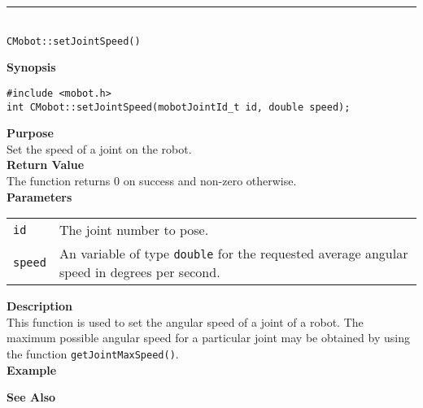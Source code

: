 \noindent
\vspace{5pt}
\rule{4.5in}{0.015in}\\
\noindent
{\LARGE \texttt{CMobot::setJointSpeed()}}\\
{}

\noindent
{\bf Synopsis}
\vspace{-8pt}
\begin{verbatim}
#include <mobot.h>
int CMobot::setJointSpeed(mobotJointId_t id, double speed);
\end{verbatim}

\noindent
{\bf Purpose}\\
Set the speed of a joint on the robot.\\

\noindent
{\bf Return Value}\\
The function returns 0 on success and non-zero otherwise.\\

\noindent
{\bf Parameters}
\vspace{-0.1in}
\begin{description}
\item               
\begin{tabular}{p{10 mm}p{145 mm}}
\texttt{id} & The joint number to pose. \\
\texttt{speed} & An variable of type \texttt{double} for the requested average
angular speed in degrees per second.
\end{tabular}
\end{description}

\noindent
{\bf Description}\\
This function is used to set the angular speed of a joint of a robot. The
maximum possible angular speed for a particular joint may be obtained
by using the function \texttt{getJointMaxSpeed()}.
\noindent\\
{\bf Example}\\
\noindent

\noindent
{\bf See Also}\\

